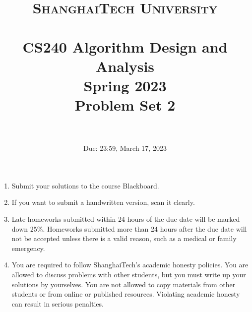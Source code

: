 \documentclass{article}
\title{
    \normalfont \normalsize
    \textsc{ShanghaiTech University} \\ [25pt]
    \horrule{0.5pt} \\[0.4cm] %
    \huge CS240 Algorithm Design and Analysis \\ %
    \LARGE Spring 2023\\
    \LARGE Problem Set 2\\
    \horrule{2pt} \\[0.5cm] %
}
\author{}
\date{Due: 23:59, March 17, 2023}
\begin{document}
\maketitle
\vspace{3ex}

\begin{enumerate}
\item Submit your solutions to the course Blackboard.
\item If you want to submit a handwritten version, scan it clearly.
\item Late homeworks submitted within 24 hours of the due date will be marked down 25\%.  Homeworks submitted more than 24 hours after the due date will not be accepted unless there is a valid reason, such as a medical or family emergency.  
\item You are required to follow ShanghaiTech's academic honesty policies.  You are allowed to discuss problems with other students, but you must write up your solutions by yourselves.  You are not allowed to copy materials from other students or from online or published resources.  Violating academic honesty can result in serious penalties.  
\end{enumerate}

\newpage

\end{document}
